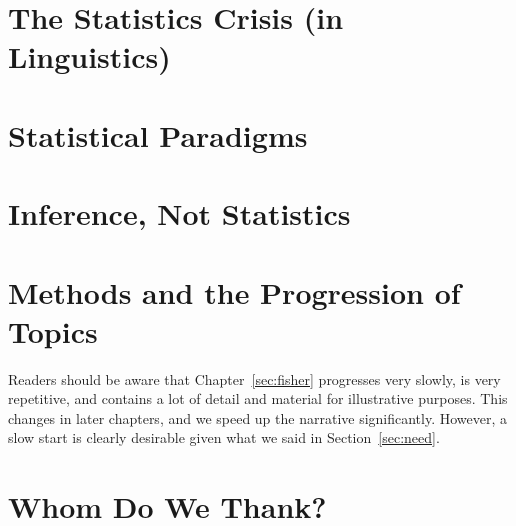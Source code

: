 \addchap{\lsPrefaceTitle}

\section*{The Statistics Crisis (in Linguistics)}\label{sec:need}

\section*{Statistical Paradigms}

\section*{Inference, Not Statistics}

\section*{Methods and the Progression of Topics}

Readers should be aware that Chapter~\ref{sec:fisher} progresses very slowly, is very repetitive, and contains a lot of detail and material for illustrative purposes.
This changes in later chapters, and we speed up the narrative significantly.
However, a slow start is clearly desirable given what we said in Section~\ref{sec:need}.

\section*{Whom Do We Thank?}

